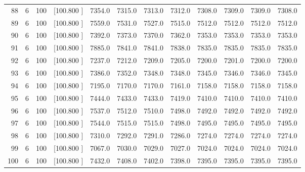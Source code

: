 \documentclass[12pt,a4paper]{article}
\begin{document}
\begin{center}
{\begin{tabular}{r r r r r r r r r r r r}
  88&  6&100&[100.800   ]&  7354.0&  7315.0&  7313.0&  7312.0&  7308.0&  7309.0&  7309.0&  7308.0\\[-0.02in]
  89&  6&100&[100.800   ]&  7559.0&  7531.0&  7527.0&  7515.0&  7512.0&  7512.0&  7512.0&  7512.0\\[-0.02in]
  90&  6&100&[100.800   ]&  7392.0&  7373.0&  7370.0&  7362.0&  7353.0&  7353.0&  7353.0&  7353.0\\[-0.02in]
  91&  6&100&[100.800   ]&  7885.0&  7841.0&  7841.0&  7838.0&  7835.0&  7835.0&  7835.0&  7835.0\\[-0.02in]
  92&  6&100&[100.800   ]&  7237.0&  7212.0&  7209.0&  7205.0&  7200.0&  7201.0&  7200.0&  7200.0\\[-0.02in]
  93&  6&100&[100.800   ]&  7386.0&  7352.0&  7348.0&  7348.0&  7345.0&  7346.0&  7346.0&  7345.0\\[-0.02in]
  94&  6&100&[100.800   ]&  7195.0&  7170.0&  7170.0&  7161.0&  7158.0&  7158.0&  7158.0&  7158.0\\[-0.02in]
  95&  6&100&[100.800   ]&  7444.0&  7433.0&  7433.0&  7419.0&  7410.0&  7410.0&  7410.0&  7410.0\\[-0.02in]
  96&  6&100&[100.800   ]&  7537.0&  7512.0&  7510.0&  7498.0&  7492.0&  7492.0&  7492.0&  7492.0\\[-0.02in]
  97&  6&100&[100.800   ]&  7544.0&  7515.0&  7515.0&  7498.0&  7495.0&  7495.0&  7495.0&  7495.0\\[-0.02in]
  98&  6&100&[100.800   ]&  7310.0&  7292.0&  7291.0&  7286.0&  7274.0&  7274.0&  7274.0&  7274.0\\[-0.02in]
  99&  6&100&[100.800   ]&  7067.0&  7030.0&  7029.0&  7027.0&  7024.0&  7024.0&  7024.0&  7024.0\\[-0.02in]
 100&  6&100&[100.800   ]&  7432.0&  7408.0&  7402.0&  7398.0&  7395.0&  7395.0&  7395.0&  7395.0\\[-0.02in]

\hline
\end{tabular}}
\end{center}
\newpage
\end{document}

